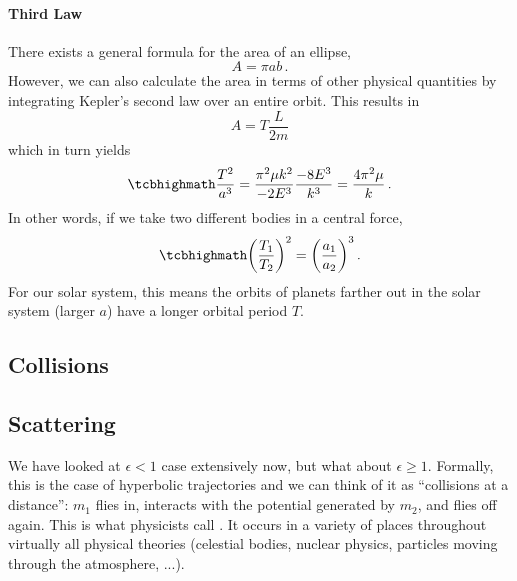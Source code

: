 \documentclass[../class_mech_main.tex]{subfiles}
\begin{document}
			\paragraph{Third Law}
There exists a general formula for the area of an ellipse,
\begin{equation}
	A = \pi a b
	\, .
\end{equation}
However, we can also calculate the area in terms of other physical quantities by integrating Kepler's second law over an entire orbit. This results in
\begin{equation}
	A = T \frac{L}{2m}
\end{equation}
which in turn yields
\begin{equation}
	\eqbox{
		\frac{T^2}{a^3} = \frac{\pi^2 \mu k^2}{- 2 E^3} \frac{- 8 E^3}{k^3} = \frac{4\pi^2 \mu}{k}
	}
	\, .
\end{equation}
In other words, if we take two different bodies in a central force,
\begin{equation}
	\eqbox{
		\qty(\frac{T_1}{T_2})^2 = \qty(\frac{a_1}{a_2})^3
	} \, .
\end{equation}
For our solar system, this means the orbits of planets farther out in the solar system (larger $a$) have a longer orbital period $T$.



		\subsection{Collisions}



		\subsection{Scattering}
We have looked at $\epsilon < 1$ case extensively now, but what about $\epsilon \geq 1$. Formally, this is the case of hyperbolic trajectories and we can think of it as \enquote{collisions at a distance}: $m_1$ flies in, interacts with the potential generated by $m_2$, and flies off again. This is what physicists call . It occurs in a variety of places throughout virtually all physical theories (celestial bodies, nuclear physics, particles moving through the atmosphere, ...). %
\end{document}
